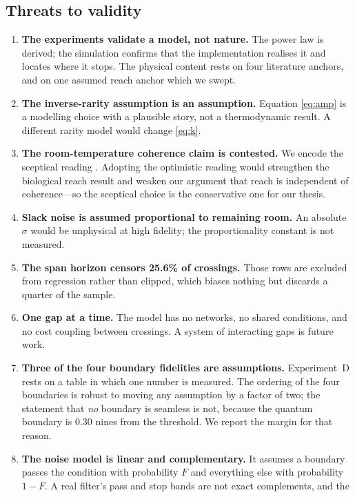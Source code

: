 \documentclass[conference]{IEEEtran}
\theoremstyle{definition}
\begin{document}
\subsection{Threats to validity}
\label{sec:threats}

\begin{enumerate}
\item \textbf{The experiments validate a model, not nature.} The power law is
derived; the simulation confirms that the implementation realises it and locates
where it stops. The physical content rests on four literature anchors, and on one
assumed reach anchor which we swept.
\item \textbf{The inverse-rarity assumption is an assumption.} Equation
\eqref{eq:amp} is a modelling choice with a plausible story, not a thermodynamic
result. A different rarity model would change \eqref{eq:k}.
\item \textbf{The room-temperature coherence claim is contested.} We encode the
sceptical reading \cite{duan2017}. Adopting the optimistic reading
\cite{panitchayangkoon2010} would strengthen the biological reach result and weaken
our argument that reach is independent of coherence---so the sceptical choice is
the conservative one for our thesis.
\item \textbf{Slack noise is assumed proportional to remaining room.} An absolute
$\sigma$ would be unphysical at high fidelity; the proportionality constant is not
measured.
\item \textbf{The span horizon censors \num{25.6}\% of crossings.} Those rows are
excluded from regression rather than clipped, which biases nothing but discards a
quarter of the sample.
\item \textbf{One gap at a time.} The model has no networks, no shared conditions,
and no cost coupling between crossings. A system of interacting gaps is future work.
\item \textbf{Three of the four boundary fidelities are assumptions.} Experiment~D
rests on a table in which one number is measured. The ordering of the four
boundaries is robust to moving any assumption by a factor of two; the statement
that \emph{no} boundary is seamless is not, because the quantum boundary is
\num{0.30} nines from the threshold. We report the margin for that reason.
\item \textbf{The noise model is linear and complementary.} It assumes a boundary
passes the condition with probability $F$ and everything else with probability
$1-F$. A real filter's pass and stop bands are not exact complements, and the

\end{enumerate}
\end{document}
